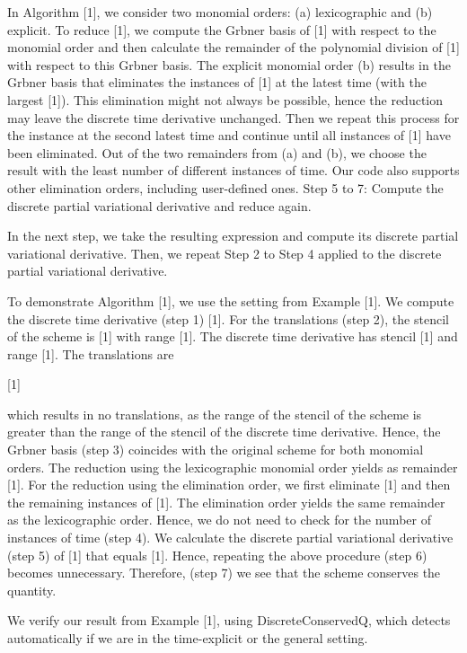 \documentclass{article}
\begin{document}
	In Algorithm [1], we consider two monomial orders: (a) lexicographic and (b) explicit.
	To reduce [1], we compute the Gr{}bner basis of [1] with respect to the monomial order and then calculate the remainder of the polynomial division of [1] with respect to this Gr{}bner basis.
	The explicit monomial order (b) results in the Gr{}bner basis that eliminates the instances of [1] at the latest time (with the largest [1]). This elimination might not always be possible, hence the reduction may leave the discrete time derivative unchanged. Then we repeat this process for the instance at the second latest time and continue until all instances of [1] have been eliminated.
	Out of the two remainders from (a) and (b), we choose the result with the least number of different instances of time. Our code also supports other elimination orders, including user-defined ones.
Step 5 to 7: Compute the discrete partial variational derivative and reduce again.


	In the next step, we take the resulting expression and compute its discrete partial variational derivative. Then, we repeat Step 2 to Step 4 applied to the discrete partial variational derivative.
	
		
		To demonstrate Algorithm [1], we use the setting from Example [1].
		We compute the discrete time derivative (step 1)
		[1].
		For the translations (step 2), the stencil of the scheme is
		[1]
	with range [1].
	The discrete time derivative has stencil [1]
	and range [1].
	The translations are
	
	[1]
	
	which results in no translations, as the range of the stencil of the scheme is greater than the range of the stencil of the discrete time derivative.
	Hence, the Gr{}bner basis (step 3) coincides with the original scheme for both monomial orders.
	The reduction using the lexicographic monomial order yields as remainder
	[1].
	For the reduction using the elimination order, we first eliminate [1] and then the remaining instances of [1].
	The elimination order yields the same remainder as the lexicographic order. Hence, we do not need to check for the number of instances of time (step 4).
	We calculate the discrete partial variational derivative (step 5) of
	[1]
	that equals [1].
	Hence, repeating the above procedure (step 6) becomes unnecessary.
	Therefore, (step 7) we see that the scheme conserves the quantity.
	
	
		We verify our result from Example [1], using {DiscreteConservedQ}, which detects automatically if we are in the time-explicit or the general setting.
		
\end{document}
